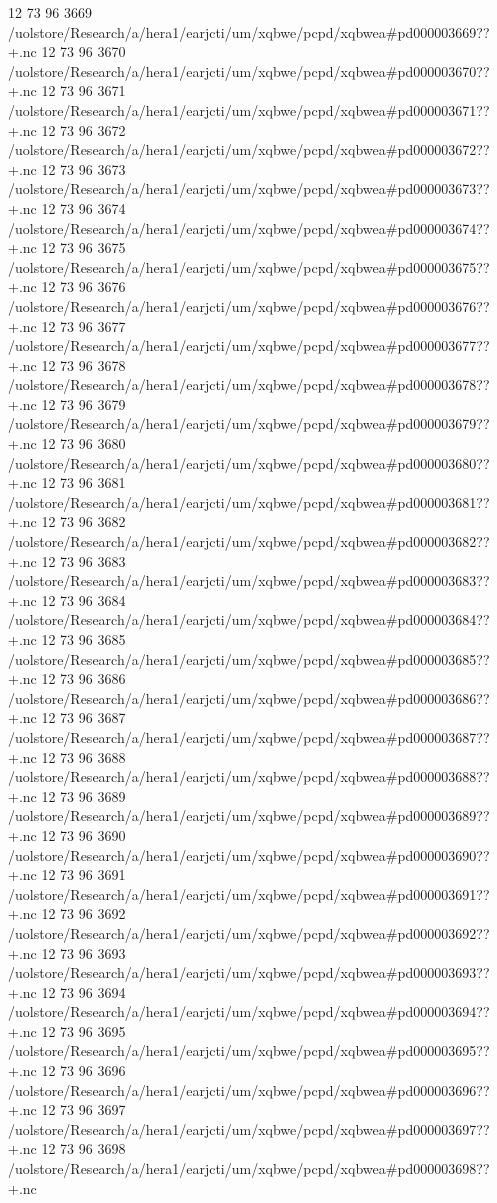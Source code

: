 12 73 96
3669
/uolstore/Research/a/hera1/earjcti/um/xqbwe/pcpd/xqbwea#pd000003669??+.nc
12 73 96
3670
/uolstore/Research/a/hera1/earjcti/um/xqbwe/pcpd/xqbwea#pd000003670??+.nc
12 73 96
3671
/uolstore/Research/a/hera1/earjcti/um/xqbwe/pcpd/xqbwea#pd000003671??+.nc
12 73 96
3672
/uolstore/Research/a/hera1/earjcti/um/xqbwe/pcpd/xqbwea#pd000003672??+.nc
12 73 96
3673
/uolstore/Research/a/hera1/earjcti/um/xqbwe/pcpd/xqbwea#pd000003673??+.nc
12 73 96
3674
/uolstore/Research/a/hera1/earjcti/um/xqbwe/pcpd/xqbwea#pd000003674??+.nc
12 73 96
3675
/uolstore/Research/a/hera1/earjcti/um/xqbwe/pcpd/xqbwea#pd000003675??+.nc
12 73 96
3676
/uolstore/Research/a/hera1/earjcti/um/xqbwe/pcpd/xqbwea#pd000003676??+.nc
12 73 96
3677
/uolstore/Research/a/hera1/earjcti/um/xqbwe/pcpd/xqbwea#pd000003677??+.nc
12 73 96
3678
/uolstore/Research/a/hera1/earjcti/um/xqbwe/pcpd/xqbwea#pd000003678??+.nc
12 73 96
3679
/uolstore/Research/a/hera1/earjcti/um/xqbwe/pcpd/xqbwea#pd000003679??+.nc
12 73 96
3680
/uolstore/Research/a/hera1/earjcti/um/xqbwe/pcpd/xqbwea#pd000003680??+.nc
12 73 96
3681
/uolstore/Research/a/hera1/earjcti/um/xqbwe/pcpd/xqbwea#pd000003681??+.nc
12 73 96
3682
/uolstore/Research/a/hera1/earjcti/um/xqbwe/pcpd/xqbwea#pd000003682??+.nc
12 73 96
3683
/uolstore/Research/a/hera1/earjcti/um/xqbwe/pcpd/xqbwea#pd000003683??+.nc
12 73 96
3684
/uolstore/Research/a/hera1/earjcti/um/xqbwe/pcpd/xqbwea#pd000003684??+.nc
12 73 96
3685
/uolstore/Research/a/hera1/earjcti/um/xqbwe/pcpd/xqbwea#pd000003685??+.nc
12 73 96
3686
/uolstore/Research/a/hera1/earjcti/um/xqbwe/pcpd/xqbwea#pd000003686??+.nc
12 73 96
3687
/uolstore/Research/a/hera1/earjcti/um/xqbwe/pcpd/xqbwea#pd000003687??+.nc
12 73 96
3688
/uolstore/Research/a/hera1/earjcti/um/xqbwe/pcpd/xqbwea#pd000003688??+.nc
12 73 96
3689
/uolstore/Research/a/hera1/earjcti/um/xqbwe/pcpd/xqbwea#pd000003689??+.nc
12 73 96
3690
/uolstore/Research/a/hera1/earjcti/um/xqbwe/pcpd/xqbwea#pd000003690??+.nc
12 73 96
3691
/uolstore/Research/a/hera1/earjcti/um/xqbwe/pcpd/xqbwea#pd000003691??+.nc
12 73 96
3692
/uolstore/Research/a/hera1/earjcti/um/xqbwe/pcpd/xqbwea#pd000003692??+.nc
12 73 96
3693
/uolstore/Research/a/hera1/earjcti/um/xqbwe/pcpd/xqbwea#pd000003693??+.nc
12 73 96
3694
/uolstore/Research/a/hera1/earjcti/um/xqbwe/pcpd/xqbwea#pd000003694??+.nc
12 73 96
3695
/uolstore/Research/a/hera1/earjcti/um/xqbwe/pcpd/xqbwea#pd000003695??+.nc
12 73 96
3696
/uolstore/Research/a/hera1/earjcti/um/xqbwe/pcpd/xqbwea#pd000003696??+.nc
12 73 96
3697
/uolstore/Research/a/hera1/earjcti/um/xqbwe/pcpd/xqbwea#pd000003697??+.nc
12 73 96
3698
/uolstore/Research/a/hera1/earjcti/um/xqbwe/pcpd/xqbwea#pd000003698??+.nc
